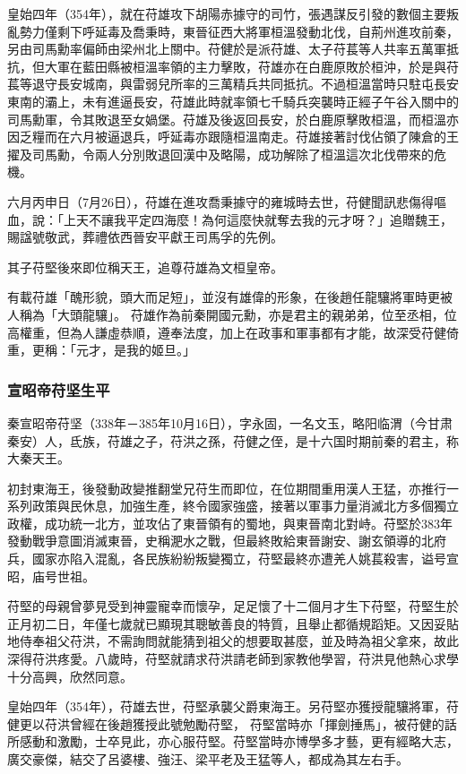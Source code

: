 皇始四年（354年），就在苻雄攻下胡陽赤據守的司竹，張遇謀反引發的數個主要叛亂勢力僅剩下呼延毒及喬秉時，東晉征西大將軍桓溫發動北伐，自荊州進攻前秦，另由司馬勳率偏師由梁州北上關中。苻健於是派苻雄、太子苻萇等人共率五萬軍抵抗，但大軍在藍田縣被桓溫率領的主力擊敗，苻雄亦在白鹿原敗於桓沖，於是與苻萇等退守長安城南，與雷弱兒所率的三萬精兵共同抵抗。不過桓溫當時只駐屯長安東南的灞上，未有進逼長安，苻雄此時就率領七千騎兵突襲時正經子午谷入關中的司馬勳軍，令其敗退至女媧堡。苻雄及後返回長安，於白鹿原擊敗桓溫，而桓溫亦因乏糧而在六月被逼退兵，呼延毒亦跟隨桓溫南走。苻雄接著討伐佔領了陳倉的王擢及司馬勳，令兩人分別敗退回漢中及略陽，成功解除了桓溫這次北伐帶來的危機。

六月丙申日（7月26日），苻雄在進攻喬秉據守的雍城時去世，苻健聞訊悲傷得嘔血，說：「上天不讓我平定四海麼！為何這麼快就奪去我的元才呀？」追贈魏王，賜諡號敬武，葬禮依西晉安平獻王司馬孚的先例。

其子苻堅後來即位稱天王，追尊苻雄為文桓皇帝。

有載苻雄「醜形貌，頭大而足短」，並沒有雄偉的形象，在後趙任龍驤將軍時更被人稱為「大頭龍驤」。
苻雄作為前秦開國元勳，亦是君主的親弟弟，位至丞相，位高權重，但為人謙虛恭順，遵奉法度，加上在政事和軍事都有才能，故深受苻健倚重，更稱：「元才，是我的姬旦。」

\subsubsection{宣昭帝苻坚生平}

秦宣昭帝苻坚（338年－385年10月16日），字永固，一名文玉，略阳临渭（今甘肃秦安）人，氐族，苻雄之子，苻洪之孫，苻健之侄，是十六国时期前秦的君主，称大秦天王。

初封東海王，後發動政變推翻堂兄苻生而即位，在位期間重用漢人王猛，亦推行一系列政策與民休息，加強生產，終令國家強盛，接著以軍事力量消滅北方多個獨立政權，成功統一北方，並攻佔了東晉領有的蜀地，與東晉南北對峙。苻堅於383年發動戰爭意圖消滅東晉，史稱淝水之戰，但最終敗給東晉謝安、謝玄領導的北府兵，國家亦陷入混亂，各民族紛紛叛變獨立，苻堅最終亦遭羌人姚萇殺害，谥号宣昭，庙号世祖。

苻堅的母親曾夢見受到神靈寵幸而懷孕，足足懷了十二個月才生下苻堅，苻堅生於正月初二日，年僅七歲就已顯現其聰敏善良的特質，且舉止都循規蹈矩。又因妥貼地侍奉祖父苻洪，不需詢問就能猜到祖父的想要取甚麼，並及時為祖父拿來，故此深得苻洪疼愛。八歲時，苻堅就請求苻洪請老師到家教他學習，苻洪見他熱心求學十分高興，欣然同意。

皇始四年（354年），苻雄去世，苻堅承襲父爵東海王。另苻堅亦獲授龍驤將軍，苻健更以苻洪曾經在後趙獲授此號勉勵苻堅， 苻堅當時亦「揮劍捶馬」，被苻健的話所感動和激勵，士卒見此，亦心服苻堅。苻堅當時亦博學多才藝，更有經略大志，廣交豪傑，結交了呂婆樓、強汪、梁平老及王猛等人，都成為其左右手。

